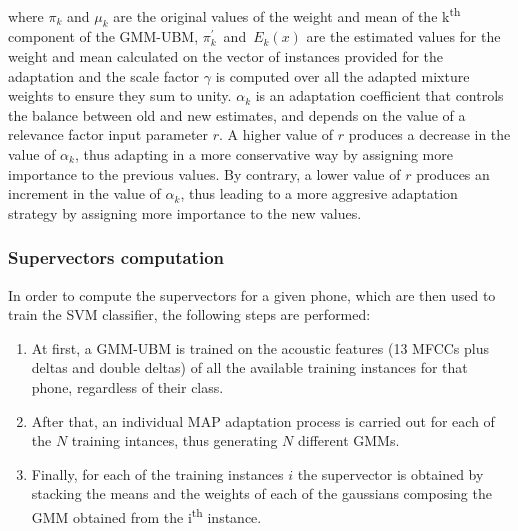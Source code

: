 where $\pi_{k}$ and $\mu_{k}$ are the original values of the weight and mean of the
k\textsuperscript{th} component of the GMM-UBM, \mbox{$\pi_{k}^{'}$ and $E_{k}(x)$} are
the estimated values for the weight and mean calculated on the vector of instances provided
for the adaptation and the scale factor $\gamma$ is computed over all the
adapted mixture weights to ensure they sum to unity. $\alpha_{k}$ is an adaptation
coefficient that controls the balance between old and new estimates, and depends on the value of
a relevance factor input parameter $r$. A higher value of $r$ produces a decrease in the value
of $\alpha_{k}$, thus adapting in a more conservative way by assigning more importance
to the previous values. By contrary, a lower value of $r$ produces an increment in the value
of $\alpha_{k}$, thus leading to a more aggresive adaptation strategy by assigning more importance
to the new values. %

\subsubsection{Supervectors computation}

In order to compute the supervectors for a given phone, which are then used to train the SVM
classifier, the following steps are performed:

\begin{enumerate}
  \item At first, a GMM-UBM is trained on the acoustic features (13 MFCCs plus deltas and double
  deltas) of all the available training instances for that phone, regardless of their class.
  \item After that, an individual MAP adaptation process is carried out for each
  of the $N$ training intances, thus generating $N$ different GMMs.
  \item Finally, for each of the training instances $i$ the supervector is obtained by stacking
  the means and the weights of each of the gaussians composing the GMM obtained from the
  i\textsuperscript{th} instance.
\end{enumerate}

